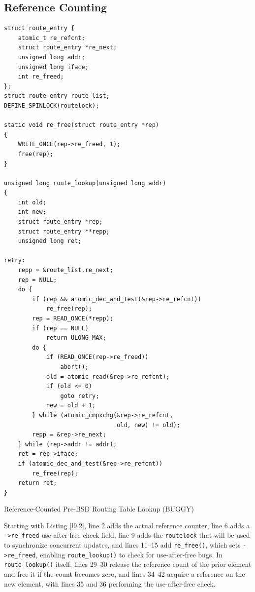 \documentclass[11pt]{article}
\begin{document}
\subsection{Reference Counting}
\label{sec:org2421229}
\label{c9.2}
\begin{listing}[htbp]
\begin{verbatim}
struct route_entry {
    atomic_t re_refcnt;
    struct route_entry *re_next;
    unsigned long addr;
    unsigned long iface;
    int re_freed;
};
struct route_entry route_list;
DEFINE_SPINLOCK(routelock);

static void re_free(struct route_entry *rep)
{
    WRITE_ONCE(rep->re_freed, 1);
    free(rep);
}

unsigned long route_lookup(unsigned long addr)
{
    int old;
    int new;
    struct route_entry *rep;
    struct route_entry **repp;
    unsigned long ret;

retry:
    repp = &route_list.re_next;
    rep = NULL;
    do {
        if (rep && atomic_dec_and_test(&rep->re_refcnt))
            re_free(rep);
        rep = READ_ONCE(*repp);
        if (rep == NULL)
            return ULONG_MAX;
        do {
            if (READ_ONCE(rep->re_freed))
                abort();
            old = atomic_read(&rep->re_refcnt);
            if (old <= 0)
                goto retry;
            new = old + 1;
        } while (atomic_cmpxchg(&rep->re_refcnt,
                                old, new) != old);
        repp = &rep->re_next;
    } while (rep->addr != addr);
    ret = rep->iface;
    if (atomic_dec_and_test(&rep->re_refcnt))
        re_free(rep);
    return ret;
}
\end{verbatim}
\caption{\label{l9.2}Reference-Counted Pre-BSD Routing Table Lookup (BUGGY)}
\end{listing}

Starting with Listing \ref{l9.2}, line 2 adds the actual reference counter, line 6 adds a \texttt{->re\_freed}
use-after-free check field, line 9 adds the \texttt{routelock} that will be used to synchronize concurrent
updates, and lines 11–15 add \texttt{re\_free()}, which sets \texttt{->re\_freed}, enabling \texttt{route\_lookup()} to check for
use-after-free bugs. In \texttt{route\_lookup()} itself, lines 29–30 release the reference count of the prior
element and free it if the count becomes zero, and lines 34–42 acquire a reference on the new element,
with lines 35 and 36 performing the use-after-free check.
\end{document}
